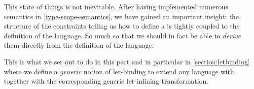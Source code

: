 This state of things is not inevitable. After having implemented numerous
semantics in \cref{type-scope-semantics}, we have gained an important insight:
the structure of the constraints telling us how to define a  is
tightly coupled to the definition of the language. So much so that we should
in fact be able to \emph{derive} them directly from the definition of the
language.

This is what we set out to do in this part and in particular in \cref{section:letbinding}
where we define a \emph{generic} notion of let-binding to extend any language
with together with the corresponding generic let-inlining transformation.
